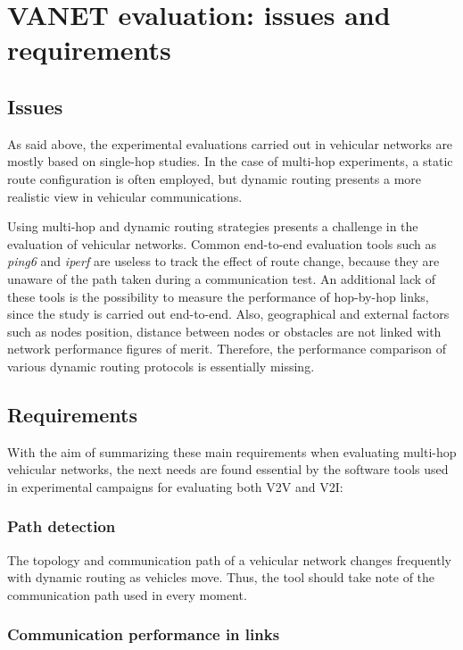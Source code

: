 \documentclass[fonts]{icst}
\begin{document}
\section{VANET evaluation: issues and requirements}
\label{lbl:issues}

\subsection{Issues}

As said above, the experimental evaluations carried out in vehicular networks are mostly based on single-hop studies. In the case of multi-hop experiments, a static route configuration is often employed, but dynamic routing presents a more realistic view in vehicular communications. 

Using multi-hop and dynamic routing strategies presents a challenge in the evaluation of vehicular networks.
Common end-to-end evaluation tools such as \textit{ping6} and \textit{iperf} are useless to track the effect of route change, because they are unaware of the path taken during a communication test. An additional lack of these tools is the possibility to measure the performance of hop-by-hop links, since the study is carried out end-to-end. Also, geographical and external factors such as nodes position, distance between nodes or obstacles are not linked with network performance figures of merit.
Therefore, the performance comparison of various dynamic routing
protocols is essentially missing. 

\subsection{Requirements}
\label{lbl:requirements}

With the aim of summarizing these main requirements when evaluating multi-hop vehicular networks, the next needs are found essential by the software tools used in experimental campaigns for evaluating both V2V and V2I:


\subsubsection{Path detection} 

The topology and communication path of a vehicular network changes frequently with dynamic routing as
vehicles move. Thus, the tool should take note of the communication path used in every moment.

\subsubsection{Communication performance in links} 
\end{document}
